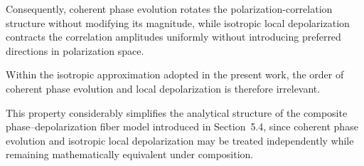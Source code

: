 \medskip

Consequently, coherent phase evolution rotates the polarization-correlation structure without modifying its magnitude, while isotropic local depolarization contracts the correlation amplitudes uniformly without introducing preferred directions in polarization space.

\medskip

Within the isotropic approximation adopted in the present work, the order of coherent phase evolution and local depolarization is therefore irrelevant.

\medskip

This property considerably simplifies the analytical structure of the composite phase--depolarization fiber model introduced in Section~5.4, since coherent phase evolution and isotropic local depolarization may be treated independently while remaining mathematically equivalent under composition.
